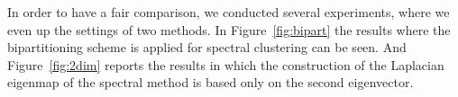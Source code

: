 In order to have a fair comparison, we conducted several experiments, where we even up the settings of two methods.
In Figure~\ref{fig:bipart} the results where the bipartitioning scheme is applied for spectral clustering can be seen. 
And Figure~\ref{fig:2dim} reports the results in which the construction of the Laplacian eigenmap of
the spectral method is based only on the second eigenvector. 
\begin{figure}[htbp]
 \centering
{}
\quad%


\end{figure}
